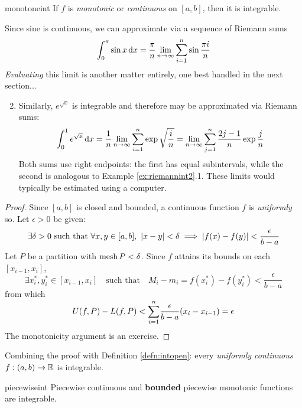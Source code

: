 \begin{thm}{}{monotoneint}
	If $f$ is \emph{monotonic} or \emph{continuous} on $[a,b]$, then it is integrable.
\end{thm}


\begin{examples}{}{}
	\exstart Since sine is continuous, we can approximate via a sequence of Riemann sums
	\[
		\int_0^\pi\sin x\,{\mathrm{d} x} 
		=\frac\pi{n}\lim_{n\to\infty}\sum_{i=1}^n\sin\frac{\pi i}n
	\]
	\emph{Evaluating} this limit is another matter entirely, one best handled in the next section...\vspace{-3pt}
	\begin{enumerate}\setcounter{enumi}{1}
	  \item Similarly, $e^{\sqrt x}$ is integrable and therefore may be approximated via Riemann sums:
	  \[
	  	\int_0^1 e^{\sqrt x}\,{\mathrm{d} x} 
	  	=\frac 1{n}\lim\limits_{n\to\infty}\sum_{i=1}^n \exp\sqrt{\frac in} 
	  	=\lim\limits_{n\to\infty}\sum_{j=1}^n \frac{2j-1}n\exp\frac jn
	  \]
	  Both sums use right endpoints: the first has equal subintervals, while the second is analogous to Example \ref{ex:riemannint2}.1. These limits would typically be estimated using a computer.
	\end{enumerate}
\end{examples}

\begin{proof}
	Since $[a,b]$ is closed and bounded, a continuous function $f$ is \emph{uniformly} so. Let $\epsilon>0$ be given:
	\[
		\exists\delta>0\text{ such that }
		\forall x,y\in[a,b],\ 
		\nm{x-y}<\delta \implies \nm{f(x)-f(y)}<\frac\epsilon{b-a}
	\]
	Let $P$ be a partition with $\operatorname{mesh} P<\delta$. Since $f$ attains its bounds on each $[x_{i-1},x_i]$,
	\[
		\exists x_i^*,y_i^*\in [x_{i-1},x_i]
		\quad\text{such that}\quad 
		M_i-m_i=f(x_i^*)-f(y_i^*)<\frac\epsilon{b-a}
	\]
	from which
	\[
		U(f,P)-L(f,P)
		<\smash[t]{\sum_{i=1}^n}\frac\epsilon{b-a}(x_i-x_{i-1})
		=\epsilon
	\]
	The monotonicity argument is an exercise.
\end{proof}

Combining the proof with Definition \ref{defn:intopen}: every \emph{uniformly continuous} $f:(a,b)\to\mathbb{R}$ is integrable.

\goodbreak


\begin{cor}{}{piecewiseint}
	Piecewise continuous and \textbf{bounded} piecewise monotonic functions are integrable.
\end{cor}


